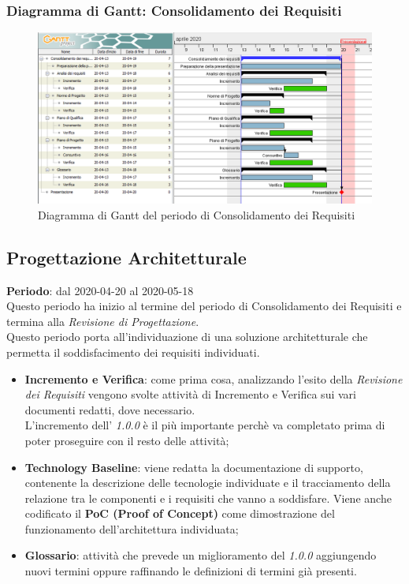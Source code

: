 	\subsubsection{Diagramma di Gantt: Consolidamento dei Requisiti}
		\begin{figure}[h]
			\centering
			\includegraphics[width=1.1\textwidth]{./res/img/DiagrammiGantt/cons_req_gantt.png}
			\caption{Diagramma di Gantt del periodo di Consolidamento dei Requisiti}
		\end{figure}
\newpage

\subsection{Progettazione Architetturale}
\textbf{Periodo}: dal 2020-04-20 al 2020-05-18 \\
Questo periodo ha inizio al termine del periodo di Consolidamento dei Requisiti e termina alla \textit{Revisione di Progettazione}. \\
Questo periodo porta all'individuazione di una soluzione architetturale che permetta il soddisfacimento dei requisiti individuati.
\begin{itemize}
	\item \textbf{Incremento e Verifica}: come prima cosa, analizzando l'esito della \textit{Revisione dei Requisiti} vengono svolte attività di Incremento e Verifica sui vari documenti redatti, dove necessario. \\
	L'incremento dell'\textit{\AdR{} 1.0.0} è il più importante perchè va completato prima di poter proseguire con il resto delle attività;
	\item \textbf{Technology Baseline}: viene redatta la documentazione di supporto, contenente la descrizione delle tecnologie individuate e il tracciamento della relazione tra le componenti e i requisiti che vanno a soddisfare. Viene anche codificato il \textbf{PoC (Proof of Concept)} come dimostrazione del funzionamento dell'architettura individuata;
	\item \textbf{Glossario}: attività che prevede un miglioramento del \textit{\Glossario{} 1.0.0} aggiungendo nuovi termini oppure raffinando le definizioni di termini già presenti.
\end{itemize}
